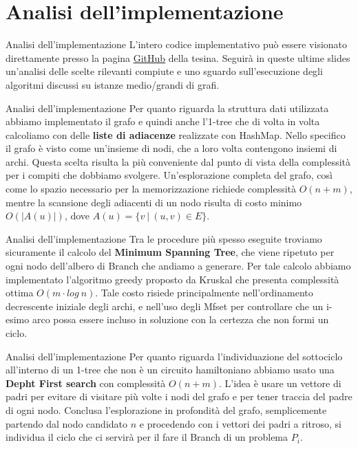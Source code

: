 \documentclass[10pt]{beamer}
\begin{document}
\section{Analisi dell'implementazione}
\begin{frame}{Analisi dell'implementazione}
    L'intero codice implementativo può essere visionato direttamente presso la pagina \href{https://github.com/LorenzoSciandra/TesinaOttimizzazioneCombinatoria}{GitHub} della tesina. Seguirà in queste ultime slides un'analisi delle scelte rilevanti compiute e uno sguardo sull'esecuzione degli algoritmi discussi su istanze medio/grandi di grafi.
\end{frame}

\begin{frame}{Analisi dell'implementazione}
    Per quanto riguarda la struttura dati utilizzata abbiamo implementato il grafo e quindi anche l'1-tree che di volta in volta calcoliamo con delle \textbf{liste di adiacenze} realizzate con HashMap. Nello specifico il grafo è visto come un'insieme di nodi, che a loro volta contengono insiemi di archi. Questa scelta risulta la più conveniente dal punto di vista della complessità per i compiti che dobbiamo svolgere. Un'esplorazione completa del grafo, così come lo spazio necessario per la memorizzazione richiede complessità $O(n+m)$, mentre la scansione degli adiacenti di un nodo risulta di costo minimo $O(|A(u)|)$, dove $A(u) = \{v \:|\: (u,v) \in E\}$.
\end{frame}

\begin{frame}{Analisi dell'implementazione}
    Tra le procedure più spesso eseguite troviamo sicuramente il calcolo del \textbf{Minimum Spanning Tree}, che viene ripetuto per ogni nodo dell'albero di Branch che andiamo a generare. Per tale calcolo abbiamo implementato l'algoritmo greedy proposto da Kruskal che presenta complessità ottima $O(m \cdot log\:n)$. Tale costo risiede principalmente nell'ordinamento decrescente iniziale degli archi, e nell'uso degli Mfset per controllare che un i-esimo arco possa essere incluso in soluzione con la certezza che non formi un ciclo.
\end{frame}

\begin{frame}{Analisi dell'implementazione}
    Per quanto riguarda l'individuazione del sottociclo all'interno di un 1-tree che non è un circuito hamiltoniano abbiamo usato una \textbf{Depht First search} con complessità $O(n+m)$. L'idea è usare un vettore di padri per evitare di visitare più volte i nodi del grafo e per tener traccia del padre di ogni nodo. Conclusa l'esplorazione in profondità del grafo, semplicemente partendo dal nodo candidato $n$ e procedendo con i vettori dei padri a ritroso, si individua il ciclo che ci servirà per il fare il Branch di un problema $P_i$.
\end{frame}
\end{document}

